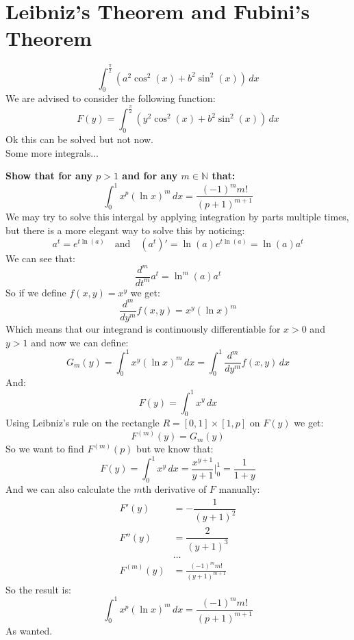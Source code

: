 \documentclass{article}
\theoremstyle{plain}
\newcommand{\N}{\mathbb{N}}
\begin{document}
	\newpage
	
	\section{Leibniz's Theorem and Fubini's Theorem}
	\[
		\int_{0}^{\frac{\pi}{2}}{(a^2\cos^2(x) + b^2\sin^2(x))\,dx}
	\]
	We are advised to consider the following function:
	\[
		F(y) = 
		\int_{0}^{\frac{\pi}{2}}{(y^2\cos^2(x) + b^2\sin^2(x))\,dx}
	\]
	Ok this can be solved but not now.\\
	
	Some more integrals...
	
	\newpage
	
	\textbf{Show that for any $p > 1$ and for any $m\in\N$ that:
	\[
		\int_{0}^{1}{x^p(\ln x)^m\,dx} = \frac{(-1)^m m!}{(p+1)^{m+1}}
	\]}
	We may try to solve this intergal by applying integration by parts
	multiple times, but there is a more elegant way to solve this by
	noticing:
	\[
		a^t = e^{t\ln(a)} 
		\quad\text{and}\quad
		(a^t)' = \ln(a) e^{t\ln(a)} = \ln(a) a^t
	\]
	We can see that:
	\[
		\frac{d^m}{dt^m}a^t = \ln^m(a) a^t
	\]
	So if we define $f(x,y) = x^y$ we get:
	\[
		\frac{d^m}{dy^m}f(x,y) = x^y (\ln x)^m
	\]
	Which means that our integrand is continuously differentiable for
	$x > 0$ and $y > 1$ and now we can define:
	\[
		G_m(y) = 
		\int_{0}^{1}{x^y(\ln x)^m\,dx} = 
		\int_{0}^{1}{\frac{d^m}{dy^m}f(x,y)\,dx}
	\]
	And:
	\[
		F(y) = \int_{0}^{1}{x^y\,dx}
	\]
	Using Leibniz's rule on the rectangle $R = [0,1]\times[1,p]$ on $F(y)$
	we get:
	\[
		F^{(m)}(y) = G_m(y)
	\]
	So we want to find $F^{(m)}(p)$ but we know that:
	\[
		F(y) = \int_{0}^{1}{x^y\,dx} = \frac{x^{y+1}}{y+1}\biggr\vert_0^1 =
		\frac{1}{1+y}
	\]
	And we can also calculate the $m$th derivative of $F$ manually:
	\begin{align*}
		F'(y) &= -\dfrac{1}{\left(y+1\right)^2} \\
		F''(y) &= \dfrac{2}{\left(y+1\right)^3} \\
		&\dots \\
		F^{(m)}(y) &= \frac{(-1)^m m!}{(y+1)^{m+1}}
	\end{align*}
	So the result is:
	\[
		\int_{0}^{1}{x^p(\ln x)^m\,dx} = \frac{(-1)^m m!}{(p+1)^{m+1}}
	\]
	As wanted.
	
	\newpage
\end{document}
